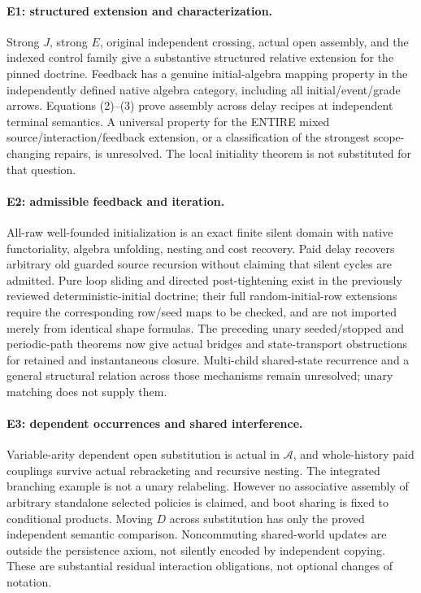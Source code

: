 \documentclass[11pt]{article}
\begin{document}
\paragraph{E1: structured extension and characterization.}
Strong $J$, strong $E$, original independent crossing, actual open assembly,
and the indexed control family give a substantive structured relative
extension for the pinned doctrine. Feedback has a genuine initial-algebra
mapping property in the independently defined native algebra category,
including all initial/event/grade arrows. Equations (2)--(3) prove assembly
across delay recipes at independent terminal semantics. A universal property
for the ENTIRE mixed source/interaction/feedback extension, or a classification
of the strongest scope-changing repairs, is unresolved. The local initiality
theorem is not substituted for that question.

\paragraph{E2: admissible feedback and iteration.}
All-raw well-founded initialization is an exact finite silent domain with
native functoriality, algebra unfolding, nesting and cost recovery. Paid
delay recovers arbitrary old guarded source recursion without claiming that
silent cycles are admitted. Pure loop sliding and directed post-tightening
exist in the previously reviewed deterministic-initial doctrine; their full
random-initial-row extensions require the corresponding row/seed maps to
be checked, and are not imported merely from identical shape formulas.
The preceding unary seeded/stopped and periodic-path theorems now give
actual bridges and state-transport obstructions for retained and instantaneous
closure. Multi-child shared-state recurrence and a general structural relation
across those mechanisms remain unresolved; unary matching does not supply them.

\paragraph{E3: dependent occurrences and shared interference.}
Variable-arity dependent open substitution is actual in $\mathcal A$, and
whole-history paid couplings survive actual rebracketing and recursive
nesting. The integrated branching example is not a unary relabeling.
However no associative assembly of arbitrary standalone selected policies
is claimed, and boot sharing is fixed to conditional products. Moving $D$
across substitution has only the proved independent semantic comparison.
Noncommuting shared-world updates are outside the persistence axiom, not
silently encoded by independent copying. These are substantial residual
interaction obligations, not optional changes of notation.
\end{document}

